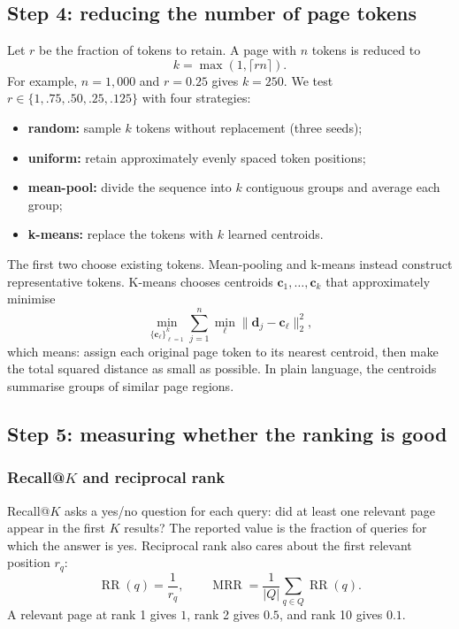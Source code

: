 \documentclass[11pt,a4paper]{article}
\begin{document}
\subsection{Step 4: reducing the number of page tokens}

Let $r$ be the fraction of tokens to retain. A page with $n$ tokens is reduced to
\begin{equation}
k=\max(1,\lceil r n\rceil).
\end{equation}
For example, $n=1{,}000$ and $r=0.25$ gives $k=250$. We test $r\in\{1,.75,.50,.25,.125\}$ with four strategies:
\begin{itemize}
  \item \textbf{random:} sample $k$ tokens without replacement (three seeds);
  \item \textbf{uniform:} retain approximately evenly spaced token positions;
  \item \textbf{mean-pool:} divide the sequence into $k$ contiguous groups and average each group;
  \item \textbf{k-means:} replace the tokens with $k$ learned centroids.
\end{itemize}
The first two choose existing tokens. Mean-pooling and k-means instead construct representative tokens. K-means chooses centroids $\bm c_1,\ldots,\bm c_k$ that approximately minimise
\begin{equation}
\min_{\{\bm c_\ell\}_{\ell=1}^{k}}\sum_{j=1}^{n}\min_{\ell}\|\bm d_j-\bm c_\ell\|_2^2,
\end{equation}
which means: assign each original page token to its nearest centroid, then make the total squared distance as small as possible. In plain language, the centroids summarise groups of similar page regions.

\subsection{Step 5: measuring whether the ranking is good}

\subsubsection*{Recall@$K$ and reciprocal rank}

Recall@$K$ asks a yes/no question for each query: did at least one relevant page appear in the first $K$ results? The reported value is the fraction of queries for which the answer is yes. Reciprocal rank also cares about the first relevant position $r_q$:
\begin{equation}
\operatorname{RR}(q)=\frac{1}{r_q},
\qquad
\operatorname{MRR}=\frac{1}{|Q|}\sum_{q\in Q}\operatorname{RR}(q).
\end{equation}
A relevant page at rank 1 gives $1$, rank 2 gives $0.5$, and rank 10 gives $0.1$.
\end{document}
